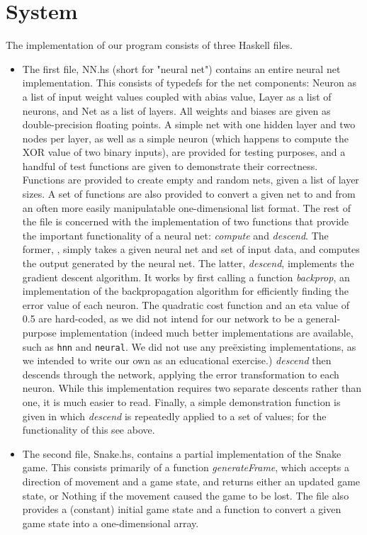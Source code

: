 \documentclass{sigplanconf}
\begin{document}
\section{System}
The implementation of our program consists of three Haskell files.
\begin{itemize}
 \item The first file, NN.hs (short for "neural net") contains an entire neural net implementation. This consists of typedefs for the net components: Neuron as a list of input weight values coupled with abias value, Layer as a list of neurons, and Net as a list of layers. All weights and biases are given as double-precision floating points. A simple net with one hidden layer and two nodes per layer, as well as a simple neuron (which happens to compute the XOR value of two binary inputs), are provided for testing purposes, and a handful of test functions are given to demonstrate their correctness. Functions are provided to create empty and random nets, given a list of layer sizes. A set of functions are also provided to convert a given net to and from an often more easily manipulatable one-dimensional list format. The rest of the file is concerned with the implementation of two functions that provide the important functionality of a neural net: \textit{compute} and \textit{descend}. The former, , simply takes a given neural net and set of input data, and computes the output generated by the neural net. The latter, \textit{descend}, implements the gradient descent algorithm. It works by first calling a function \textit{backprop}, an implementation of the backpropagation algorithm for efficiently finding the error value of each neuron. The quadratic cost function and an eta value of 0.5 are hard-coded, as we did not intend for our network to be a general-purpose implementation (indeed much better implementations are available, such as \texttt{hnn} and \texttt{neural}. We did not use any preëxisting implementations, as we intended to write our own as an educational exercise.) \textit{descend} then descends through the network, applying the error transformation to each neuron. While this implementation requires two separate descents rather than one, it is much easier to read. Finally, a simple demonstration function is given in which \textit{descend} is repeatedly applied to a set of values; for the functionality of this see above.
 \item The second file, Snake.hs, contains a partial implementation of the Snake game. This consists primarily of a function \textit{generateFrame}, which accepts a direction of movement and a game state, and returns either an updated game state, or Nothing if the movement caused the game to be lost. The file also provides a (constant) initial game state and a function to convert a given game state into a one-dimensional array.

\end{itemize}
\end{document}

